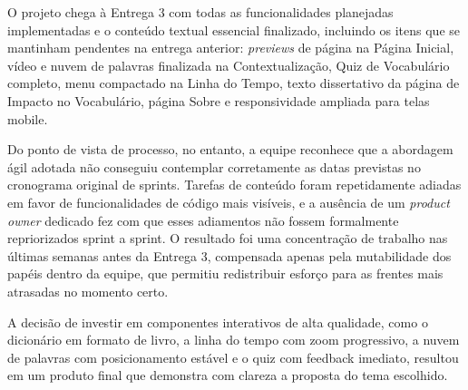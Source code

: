 \documentclass[12pt,a4paper]{article}
\begin{document}
O projeto chega à Entrega 3 com todas as funcionalidades planejadas implementadas e o conteúdo
textual essencial finalizado, incluindo os itens que se mantinham pendentes na entrega anterior:
\textit{previews} de página na Página Inicial, vídeo e nuvem de palavras finalizada na
Contextualização, Quiz de Vocabulário completo, menu compactado na Linha do Tempo, texto
dissertativo da página de Impacto no Vocabulário, página Sobre e responsividade ampliada para
telas mobile.

Do ponto de vista de processo, no entanto, a equipe reconhece que a abordagem ágil adotada não
conseguiu contemplar corretamente as datas previstas no cronograma original de sprints. Tarefas
de conteúdo foram repetidamente adiadas em favor de funcionalidades de código mais visíveis, e a
ausência de um \textit{product owner} dedicado fez com que esses adiamentos não fossem
formalmente repriorizados sprint a sprint. O resultado foi uma concentração de trabalho nas
últimas semanas antes da Entrega 3, compensada apenas pela mutabilidade dos papéis dentro da
equipe, que permitiu redistribuir esforço para as frentes mais atrasadas no momento certo.

A decisão de investir em componentes interativos de alta qualidade, como o dicionário em formato
de livro, a linha do tempo com zoom progressivo, a nuvem de palavras com posicionamento estável e
o quiz com feedback imediato, resultou em um produto final que demonstra com clareza a proposta
do tema escolhido.
\end{document}
